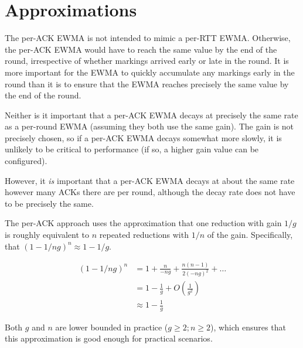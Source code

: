 \section{Approximations}\label{prresp_approx}

\balance
The per-ACK EWMA is not intended to mimic a per-RTT EWMA. Otherwise, the per-ACK
EWMA would have to reach the same value by the end of the round, irrespective of
whether markings arrived early or late in the round.
It is more important for the EWMA to quickly accumulate any markings early in
the round than it is to ensure that the EWMA reaches precisely the same value by
the end of the round. 

Neither is it important that a per-ACK EWMA decays at precisely the same rate as
a per-round EWMA (assuming they both use the same gain). The gain is not
precisely chosen, so if a per-ACK EWMA decays somewhat more slowly, it is
unlikely to be critical to performance (if so, a higher gain value can be
configured).

However, it \emph{is} important that a per-ACK EWMA decays at about the same
rate however many ACKs there are per round, although the decay rate does not
have to be precisely the same.

The per-ACK approach uses the approximation that one reduction with gain \(1/g\)
is roughly equivalent to \(n\) repeated reductions with \(1/n\) of the gain.
Specifically, that \((1 - 1/ng)^n \approx 1 - 1/g\).

\begin{align*}
(1 - 1/ng)^n &=       1 + \frac{n}{-ng} + \frac{n(n-1)}{2(-ng)^2} + \ldots \\
             &=       1 - \frac{1}{g} + O\left(\frac{1}{g^2}\right)\\
             &\approx 1 - \frac{1}{g}
\end{align*}

Both \(g\) and \(n\) are lower bounded in practice (\(g\ge2; n\ge2\)), which
ensures that this approximation is good enough for practical scenarios.
